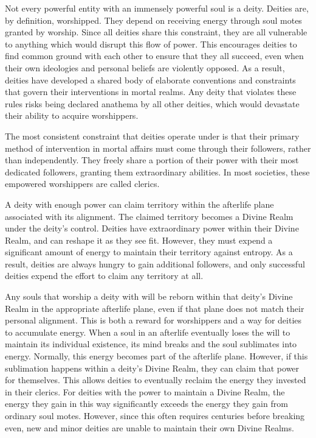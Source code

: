      Not every powerful entity with an immensely powerful soul is a deity.
      Deities are, by definition, worshipped.
      They depend on receiving energy through soul motes granted by worship.
      Since all deities share this constraint, they are all vulnerable to anything which would disrupt this flow of power.
      This encourages deities to find common ground with each other to ensure that they all succeed, even when their own ideologies and personal beliefs are violently opposed.
      As a result, deities have developed a shared body of elaborate conventions and constraints that govern their interventions in mortal realms.
      Any deity that violates these rules risks being declared anathema by all other deities, which would devastate their ability to acquire worshippers.

      The most consistent constraint that deities operate under is that their primary method of intervention in mortal affairs must come through their followers, rather than independently.
      They freely share a portion of their power with their most dedicated followers, granting them extraordinary abilities.
      In most societies, these empowered worshippers are called clerics.

      A deity with enough power can claim territory within the afterlife plane associated with its alignment.
      The claimed territory becomes a Divine Realm under the deity's control.
      Deities have extraordinary power within their Divine Realm, and can reshape it as they see fit.
      However, they must expend a significant amount of energy to maintain their territory against entropy.
      As a result, deities are always hungry to gain additional followers, and only successful deities expend the effort to claim any territory at all.

      Any souls that worship a deity with will be reborn within that deity's Divine Realm in the appropriate afterlife plane, even if that plane does not match their personal alignment.
      This is both a reward for worshippers and a way for deities to accumulate energy.
      When a soul in an afterlife eventually loses the will to maintain its individual existence, its mind breaks and the soul sublimates into energy.
      Normally, this energy becomes part of the afterlife plane.
      However, if this sublimation happens within a deity's Divine Realm, they can claim that power for themselves.
      This allows deities to eventually reclaim the energy they invested in their clerics.
      For deities with the power to maintain a Divine Realm, the energy they gain in this way significantly exceeds the energy they gain from ordinary soul motes.
      However, since this often requires centuries before breaking even, new and minor deities are unable to maintain their own Divine Realms.

